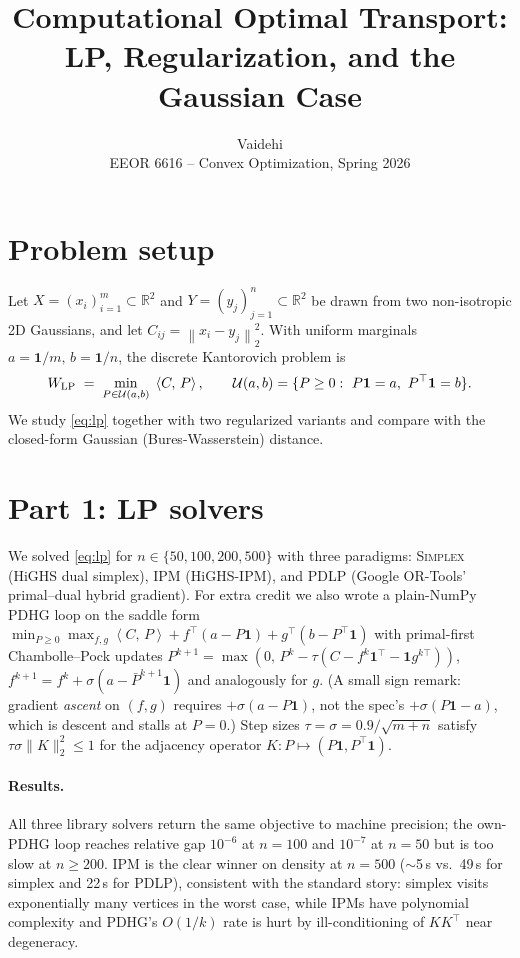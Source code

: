 \documentclass[11pt]{article}
\title{\vspace{-3em}Computational Optimal Transport: \\
       LP, Regularization, and the Gaussian Case}
\author{Vaidehi \\ EEOR 6616 -- Convex Optimization, Spring 2026}
\date{}
\newcommand{\R}{\mathbb{R}}
\newcommand{\inner}[2]{\left\langle #1,\,#2 \right\rangle}
\newcommand{\norm}[1]{\left\lVert #1 \right\rVert}
\newcommand{\Pol}{\mathcal{U}(a,b)}
\newcommand{\one}{\mathbf{1}}
\begin{document}
\maketitle
\vspace{-2em}

\section{Problem setup}
Let $X = (x_i)_{i=1}^m \subset \R^2$ and $Y=(y_j)_{j=1}^n \subset \R^2$ be drawn
from two non-isotropic 2D Gaussians, and let $C_{ij}=\norm{x_i-y_j}_2^2$. With
uniform marginals $a=\one/m,\, b=\one/n$, the discrete Kantorovich problem is
\begin{equation}\label{eq:lp}
  W_{\rm LP} \;=\; \min_{P \in \Pol} \; \inner{C}{P},
  \qquad \Pol=\{P\ge 0:\ P\one = a,\ P^\top\one=b\}.
\end{equation}
We study \eqref{eq:lp} together with two regularized variants and compare with
the closed-form Gaussian (Bures-Wasserstein) distance.

\section{Part 1: LP solvers}
We solved \eqref{eq:lp} for $n\in\{50,100,200,500\}$ with three paradigms:
\textsc{Simplex} (HiGHS dual simplex), \textsc{IPM} (HiGHS-IPM), and
\textsc{PDLP} (Google OR-Tools' primal--dual hybrid gradient).
For extra credit we also wrote a plain-NumPy PDHG loop on the saddle form
$\min_{P\ge 0}\max_{f,g}\inner{C}{P}+f^\top(a-P\one)+g^\top(b-P^\top\one)$
with primal-first Chambolle--Pock updates
$P^{k+1}=\max(0,\,P^k-\tau(C-f^k\one^\top-\one g^{k\top}))$,
$f^{k+1}=f^k+\sigma(a-\bar{P}^{k+1}\one)$ and analogously for $g$. (A small
sign remark: gradient \emph{ascent} on $(f,g)$ requires $+\sigma(a-P\one)$, not
the spec's $+\sigma(P\one-a)$, which is descent and stalls at $P=0$.) Step
sizes $\tau=\sigma=0.9/\sqrt{m+n}$ satisfy $\tau\sigma\|K\|_2^2\le 1$ for the
adjacency operator $K\colon P\mapsto(P\one,P^\top\one)$.

\paragraph{Results.} All three library solvers return the same objective to
machine precision; the own-PDHG loop reaches relative gap $10^{-6}$ at $n{=}100$
and $10^{-7}$ at $n{=}50$ but is too slow at $n{\ge}200$.
\textsc{IPM} is the clear winner on density at $n{=}500$ ($\sim$5\,s vs.\ 49\,s
for simplex and 22\,s for PDLP), consistent with the standard story: simplex
visits exponentially many vertices in the worst case, while IPMs have
polynomial complexity and PDHG's $O(1/k)$ rate is hurt by ill-conditioning of
$KK^\top$ near degeneracy.
\end{document}
